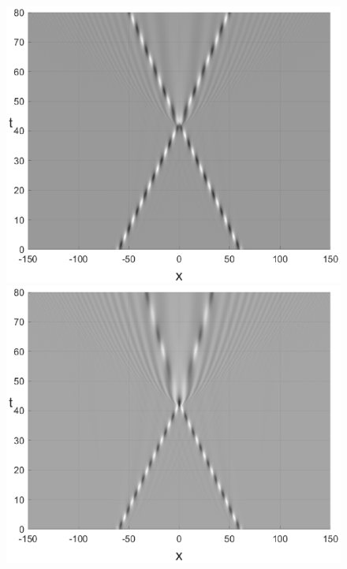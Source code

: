 \documentclass[14pt,a4paper]{extreport}
\begin{document}
\begin{figure}[H]
				\begin{minipage}[h]{0.32\linewidth}
					\includegraphics[width=1\linewidth]{fig53.eps}
				\end{minipage}
				\begin{minipage}[h]{0.32\linewidth}
					\includegraphics[width=1\linewidth]{fig56.eps}

\end{minipage}
\end{figure}
\end{document}
